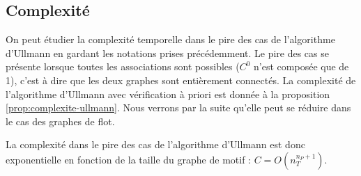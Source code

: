 



\subsection{Complexité}
On peut étudier la complexité temporelle dans le pire des cas de l'algorithme d'Ullmann en gardant les notations prises précédemment.
Le pire des cas se présente lorsque toutes les associations sont possibles \cite{MessPhd} ($C^0$ n'est composée que de 1), c'est à dire que les deux graphes sont entièrement connectés. La complexité de l'algorithme d'Ullmann avec vérification à priori est donnée à la proposition \ref{prop:complexite-ullmann}.
Nous verrons par la suite qu'elle peut se réduire dans le cas des graphes de flot.

\begin{prop}
La complexité dans le pire des cas de l'algorithme d'Ullmann est donc exponentielle en fonction de la taille du graphe de motif : $C=O(n_T^{n_P+1})$.
\label{prop:complexite-ullmann}
\end{prop}

